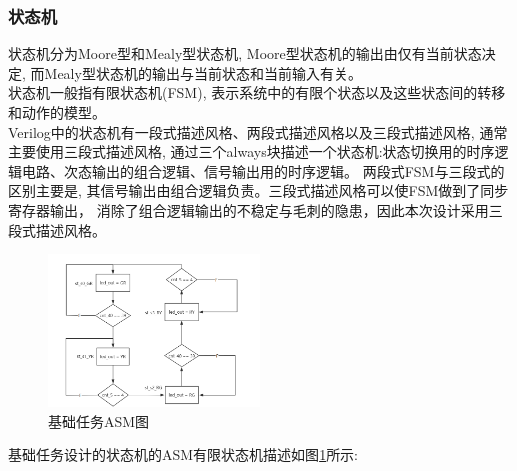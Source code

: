 \documentclass{article}
\begin{document}
\subsubsection*{状态机}
状态机分为Moore型和Mealy型状态机, Moore型状态机的输出由仅有当前状态决定, 而Mealy型状态机的输出与当前状态和当前输入有关。\\
状态机一般指有限状态机(FSM), 表示系统中的有限个状态以及这些状态间的转移和动作的模型。\\
Verilog中的状态机有一段式描述风格、两段式描述风格以及三段式描述风格, 通常主要使用三段式描述风格, 通过三个always块描述一个状态机:状态切换用的时序逻辑电路、次态输出的组合逻辑、信号输出用的时序逻辑。
两段式FSM与三段式的区别主要是, 其信号输出由组合逻辑负责。三段式描述风格可以使FSM做到了同步寄存器输出，
消除了组合逻辑输出的不稳定与毛刺的隐患，因此本次设计采用三段式描述风格。\\
\begin{figure}[htbp]
    \centering
    \includegraphics[width=0.5\textwidth]{image/2024-06-19-10-48-41.png}
    \caption{基础任务ASM图}
    \label{image_asm_1}
\end{figure}
基础任务设计的状态机的ASM有限状态机描述如图\ref{image_asm_1}所示:
\end{document}
